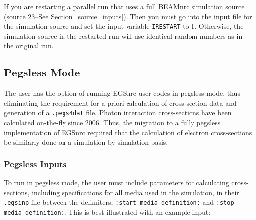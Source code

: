 \documentclass[12pt,twoside]{article}  %
\begin{document}
If you are restarting a parallel run that uses a full BEAMnrc simulation
source (source 23--See Section~\ref{source_inputs}).  Then you must go
into the input file for the simulation source and set the input variable
{\tt IRESTART} to 1.  Otherwise, the simulation source in the restarted run
will use identical random numbers as in the original run.

\subsection{Pegsless Mode}
The user has the option of running EGSnrc user codes in pegsless
mode, thus eliminating the requirement for a-priori calculation of cross-section data and generation
of a {\tt .pegs4dat} file.  Photon interaction cross-sections have been calculated on-the-fly since
2006.  Thus, the migration to a fully pegsless implementation of EGSnrc required that
the calculation of electron cross-sections be similarly done on a simulation-by-simulation
basis.

\subsubsection{Pegsless Inputs}

To run in pegsless mode, the user must include parameters for calculating cross-sections, including
specifications for all media used in the simulation, in their {\tt .egsinp} file between the
delimiters, {\tt :start media definition:} and {\tt :stop media definition:}.  This is best illustrated
with an example input:
\end{document}

